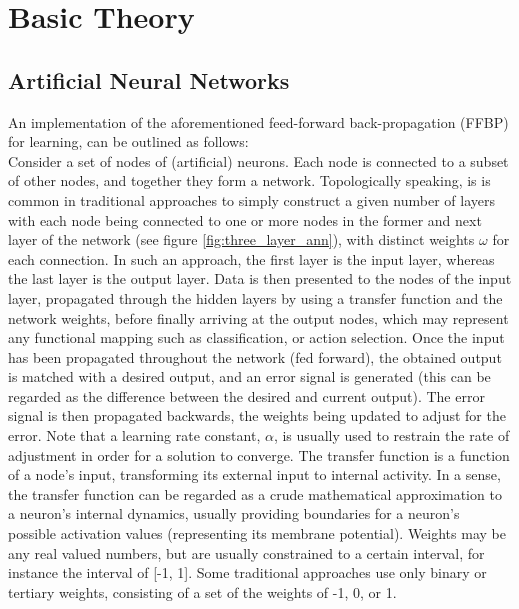 
\chapter{Basic Theory}

\section{Artificial Neural Networks}

An implementation of the aforementioned feed-forward back-propagation (FFBP) for learning, can be outlined as follows:
\\
Consider a set of nodes of (artificial) neurons. Each node is connected to a subset of other nodes, and together they form a network. Topologically speaking, is is common in traditional approaches to simply construct a given number of layers with each node being connected to one or more nodes in the former and next layer of the network (see figure \ref{fig:three_layer_ann}), with distinct weights $\omega$ for each connection. In such an approach, the first layer is the input layer, whereas the last layer is the output layer. Data is then presented to the nodes of the input layer, propagated through the hidden layers by using a transfer function and the network weights, before finally arriving at the output nodes, which may represent any functional mapping such as classification, or action selection. Once the input has been propagated throughout the network (fed forward), the obtained output is matched with a desired output, and an error signal is generated (this can be regarded as the difference between the desired and current output). The error signal is then propagated backwards, the weights being updated to adjust for the error. Note that a learning rate constant, $\alpha$, is usually used to restrain the rate of adjustment in order for a solution to converge.
The transfer function is a function of a node's input, transforming its external input to internal activity. In a sense, the transfer function can be regarded as a crude mathematical approximation to a neuron's internal dynamics, usually providing boundaries for a neuron's possible activation values (representing its membrane potential). Weights may be any real valued numbers, but are usually constrained to a certain interval, for instance the interval of [-1, 1]. Some traditional approaches use only binary or tertiary weights, consisting of a set of the weights of -1, 0, or 1.
\\
\\

